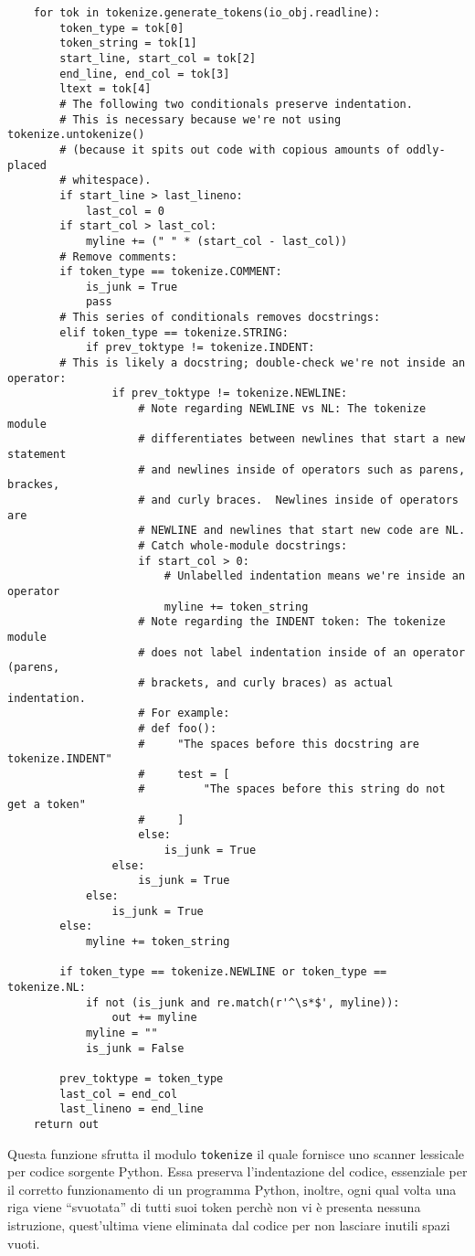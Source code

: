 \documentclass[a4paper,oneside,openright,titlepage,10pt,footinclude,headinclude]{scrbook}
\begin{document}
\begin{graybox}[innerleftmargin=2,]
\begin{lstlisting}
    for tok in tokenize.generate_tokens(io_obj.readline):
        token_type = tok[0]
        token_string = tok[1]
        start_line, start_col = tok[2]
        end_line, end_col = tok[3]
        ltext = tok[4]
        # The following two conditionals preserve indentation.
        # This is necessary because we're not using tokenize.untokenize()
        # (because it spits out code with copious amounts of oddly-placed
        # whitespace).
        if start_line > last_lineno:
            last_col = 0
        if start_col > last_col:
            myline += (" " * (start_col - last_col))
        # Remove comments:
        if token_type == tokenize.COMMENT:
            is_junk = True
            pass
        # This series of conditionals removes docstrings:
        elif token_type == tokenize.STRING:
            if prev_toktype != tokenize.INDENT:
        # This is likely a docstring; double-check we're not inside an operator:
                if prev_toktype != tokenize.NEWLINE:
                    # Note regarding NEWLINE vs NL: The tokenize module
                    # differentiates between newlines that start a new statement
                    # and newlines inside of operators such as parens, brackes,
                    # and curly braces.  Newlines inside of operators are
                    # NEWLINE and newlines that start new code are NL.
                    # Catch whole-module docstrings:
                    if start_col > 0:
                        # Unlabelled indentation means we're inside an operator
                        myline += token_string
                    # Note regarding the INDENT token: The tokenize module 
                    # does not label indentation inside of an operator (parens,
                    # brackets, and curly braces) as actual indentation.
                    # For example:
                    # def foo():
                    #     "The spaces before this docstring are tokenize.INDENT"
                    #     test = [
                    #         "The spaces before this string do not get a token"
                    #     ]
                    else:
                        is_junk = True
                else:
                    is_junk = True
            else:
                is_junk = True
        else:
            myline += token_string

        if token_type == tokenize.NEWLINE or token_type == tokenize.NL:
            if not (is_junk and re.match(r'^\s*$', myline)):
                out += myline
            myline = ""
            is_junk = False

        prev_toktype = token_type
        last_col = end_col
        last_lineno = end_line
    return out
\end{lstlisting}
\end{graybox}
Questa funzione sfrutta il modulo \texttt{tokenize} il quale  fornisce uno scanner lessicale per codice sorgente Python.
Essa preserva l'indentazione del codice, essenziale per il corretto funzionamento di un programma Python, inoltre, ogni qual volta una  riga viene ``svuotata'' di tutti suoi token perchè non vi è presenta nessuna istruzione, quest'ultima viene eliminata dal codice per non lasciare inutili spazi vuoti.
\end{document}
